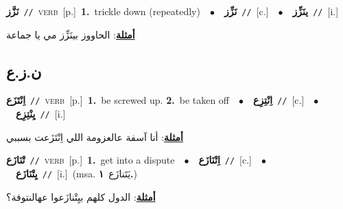 \documentclass[10pt,a4paper,twoside]{article} %
\begin{document}
\begin{multicols}{2}
{\setlength\topsep{0pt}\textbf{\foreignlanguage{arabic}{نَزَّز}}\ {\color{gray}\texttt{//}\color{black}}\ \textsc{verb}\ [p.]\ \textbf{1.}~trickle down (repeatedly)\ \ $\bullet$\ \ \setlength\topsep{0pt}\textbf{\foreignlanguage{arabic}{نَزِّز}}\ {\color{gray}\texttt{//}\color{black}}\ [c.]\ \ $\bullet$\ \ \setlength\topsep{0pt}\textbf{\foreignlanguage{arabic}{ينَزِّز}}\ {\color{gray}\texttt{//}\color{black}}\ [i.]\  \begin{flushright}\color{gray}\foreignlanguage{arabic}{\textbf{\underline{\foreignlanguage{arabic}{أمثلة}}}: الحاووز بينَزِّز مي يا جماعة}\end{flushright}\color{black}} \vspace{2mm}

\vspace{-3mm}
\subsection*{\color{blue}\foreignlanguage{arabic}{ن.ز.ع}\color{blue}{}} 

{\setlength\topsep{0pt}\textbf{\foreignlanguage{arabic}{اِنْتَزَع}}\ {\color{gray}\texttt{//}\color{black}}\ \textsc{verb}\ [p.]\ \textbf{1.}~be screwed up.  \textbf{2.}~be taken off\ \ $\bullet$\ \ \setlength\topsep{0pt}\textbf{\foreignlanguage{arabic}{اِنْتِزِع}}\ {\color{gray}\texttt{//}\color{black}}\ [c.]\ \ $\bullet$\ \ \setlength\topsep{0pt}\textbf{\foreignlanguage{arabic}{يِنْتِزِع}}\ {\color{gray}\texttt{//}\color{black}}\ [i.]\  \begin{flushright}\color{gray}\foreignlanguage{arabic}{\textbf{\underline{\foreignlanguage{arabic}{أمثلة}}}: أنا آسفة عالعزومة اللي اِنْتَزَعت بسببي}\end{flushright}\color{black}} \vspace{2mm}

{\setlength\topsep{0pt}\textbf{\foreignlanguage{arabic}{تْنَازَع}}\ {\color{gray}\texttt{//}\color{black}}\ \textsc{verb}\ [p.]\ \textbf{1.}~get into a dispute\ \ $\bullet$\ \ \setlength\topsep{0pt}\textbf{\foreignlanguage{arabic}{اِتْنَازَع}}\ {\color{gray}\texttt{//}\color{black}}\ [c.]\ \ $\bullet$\ \ \setlength\topsep{0pt}\textbf{\foreignlanguage{arabic}{يِتْنَازَع}}\ {\color{gray}\texttt{//}\color{black}}\ [i.]\ \color{gray}(msa. \foreignlanguage{arabic}{يَتَنازَع}~\foreignlanguage{arabic}{\textbf{١.}})\color{black}\  \begin{flushright}\color{gray}\foreignlanguage{arabic}{\textbf{\underline{\foreignlanguage{arabic}{أمثلة}}}: الدول كلهم بيِتْنازَعوا عهالنتوفة؟}\end{flushright}\color{black}} \vspace{2mm}


\end{multicols}
\end{document}
